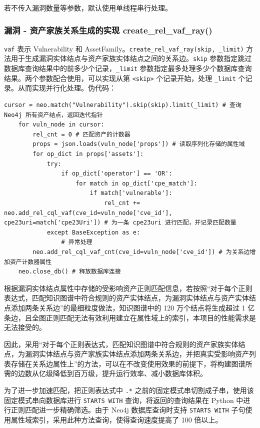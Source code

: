 \documentclass[a4paper,AutoFakeBold,oneside,12pt]{book}
\begin{document}
若不传入漏洞数量等参数，默认使用单线程串行处理。

\subsubsection{漏洞 - 资产家族关系生成的实现 create{\_}rel{\_}vaf{\_}ray()\label{subsubsec:rel_vaf}}

\lstinline|vaf| 表示 Vulnerability 和 AssetFamily。\lstinline|create_rel_vaf_ray(skip, _limit)| 方法用于生成漏洞实体结点与资产家族实体结点之间的关系边。\lstinline|skip| 参数指定跳过数据库查询结果中的前多少个记录，\lstinline|_limit| 参数指定最多处理多少个数据库查询结果。两个参数配合使用，可以实现从第 \lstinline|<skip>| 个记录开始，处理 \lstinline|_limit| 个记录。从而实现并行化处理。伪代码：
\begin{lstlisting}[style=lgeneral]
	cursor = neo.match("Vulnerability").skip(skip).limit(_limit) # 查询 Neo4j 所有资产结点，返回迭代指针
	for vuln_node in cursor:
		rel_cnt = 0 # 匹配资产的计数器
		props = json.loads(vuln_node['props']) # 读取序列化存储的属性域
		for op_dict in props['assets']:
			try:
				if op_dict['operator'] == 'OR':
					for match in op_dict['cpe_match']:
						if match['vulnerable']:
							rel_cnt += neo.add_rel_cql_vaf(cve_id=vuln_node['cve_id'], cpe23uri=match['cpe23Uri']) # 为一条 cpe23uri 进行匹配，并记录匹配数量
			except BaseException as e:
				# 异常处理
		neo.add_rel_cql_vaf_cnt(cve_id=vuln_node['cve_id']) # 为关系边增加资产计数器属性
	neo.close_db() # 释放数据库连接
\end{lstlisting}

根据漏洞实体结点属性中存储的受影响资产正则匹配信息，若按照“对于每个正则表达式，匹配知识图谱中符合规则的资产实体结点，为漏洞实体结点与资产实体结点添加两条关系边”的最细粒度做法，知识图谱中的 120 万个结点将生成超过 1 亿条边，且全图正则匹配无法有效利用建立在属性域上的索引，本项目的性能需求是无法接受的。

因此，采用“对于每个正则表达式，匹配知识图谱中符合规则的资产家族实体结点，为漏洞实体结点与资产家族实体结点添加两条关系边，并把真实受影响资产列表存储在关系边属性上”的方法，可以在不改变使用效果的前提下，将构建图谱所需的边数从亿级降低到百万级，提升运行效率、减小数据库体积。

为了进一步加速匹配，把正则表达式中 \lstinline|.*| 之前的固定模式串切割成子串，使用该固定模式串向数据库进行 \lstinline|STARTS WITH| 查询，将返回的查询结果在 Python 中进行正则匹配进一步精确筛选。由于 Neo4j 数据库查询时支持 \lstinline|STARTS WITH| 子句使用属性域索引，采用此种方法查询，使得查询速度提高了 100 倍以上。
\end{document}
